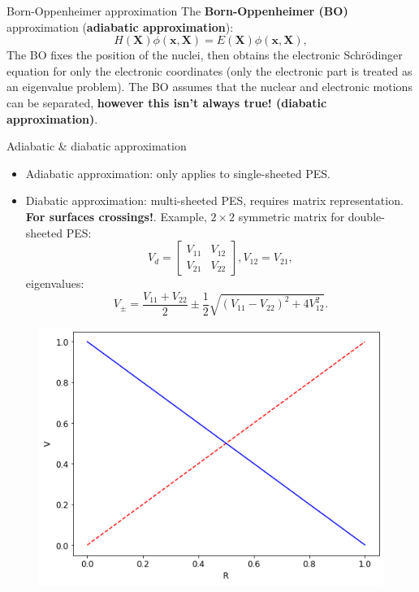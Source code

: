 \documentclass{beamer}
\newcommand\Fontvi{\fontsize{8}{7.2}\selectfont} %
\begin{document}
\begin{frame}{Born-Oppenheimer approximation}
    The \textbf{Born-Oppenheimer (BO)} approximation (\textbf{adiabatic approximation}):
    \begin{equation}
        H(\mathbf{X})\phi(\mathbf{x}, \mathbf{X}) = E(\mathbf{X})\phi(\mathbf{x}, \mathbf{X}),
        \label{eq:bo}
    \end{equation}
    The BO fixes the position of the nuclei, then obtains the electronic Schrödinger equation for only the electronic coordinates (only the electronic part is treated as an eigenvalue problem). The BO assumes that the nuclear and electronic motions can be separated, \textbf{however this isn't always true! (diabatic approximation)}.
\end{frame}
\begin{frame}{Adiabatic \& diabatic approximation}
    \Fontvi
    \begin{itemize}
        \item Adiabatic approximation: only applies to single-sheeted PES.
        \item Diabatic approximation: multi-sheeted PES, requires matrix representation. \textbf{For surfaces crossings!}. Example, $2 \times 2$ symmetric matrix for double-sheeted PES:
        \begin{equation}
            V_d = 
            \begin{bmatrix}
                V_{11} & V_{12} \\
                V_{21} & V_{22}
            \end{bmatrix}
            , V_{12} = V_{21},
        \label{2x2diabaticmatrix}
        \end{equation}
        eigenvalues:
        \begin{equation}
            V_{\pm} = \frac{V_{11} + V_{22}}{2} \pm \frac{1}{2}\sqrt{(V_{11} - V_{22})^2 + 4V_{12}^2}.
            \label{2x2ev}
        \end{equation}
    \end{itemize}
    \begin{figure}[h]
        \centering
        \includegraphics[scale=0.25]{img/slide/conint_illust.png}
        \label{fig:conint}
    \end{figure}
\end{frame}
\end{document}
